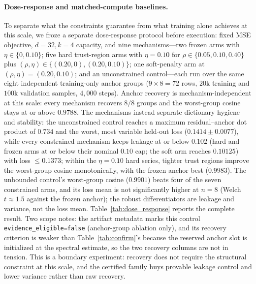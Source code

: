 \documentclass{article}
\theoremstyle{plain}
\begin{document}
{\paragraph{Dose-response and matched-compute baselines.} To separate what the constraints guarantee from what training alone achieves at this scale, we froze a separate dose-response protocol before execution: fixed MSE objective, $d{=}32,k{=}4$ capacity, and nine mechanisms---two frozen arms with $\eta\in\{0,0.10\}$; five hard trust-region arms with $\eta=0.10$ for $\rho\in\{0.05,0.10,0.40\}$ plus $(\rho,\eta)\in\{(0.20,0),(0.20,0.10)\}$; one soft-penalty arm at $(\rho,\eta)=(0.20,0.10)$; and an unconstrained control---each run over the same eight independent training-only anchor groups ($9\times 8=72$ rows, $20$k training and $100$k validation samples, $4{,}000$ steps). Anchor recovery is mechanism-independent at this scale: every mechanism recovers $8/8$ groups and the worst-group cosine stays at or above $0.9788$. The mechanisms instead separate dictionary hygiene and stability: the unconstrained control reaches a maximum residual--anchor dot product of $0.734$ and the worst, most variable held-out loss ($0.1414\pm0.0077$), while every constrained mechanism keeps leakage at or below $0.102$ (hard and frozen arms at or below their nominal $0.10$ cap; the soft arm reaches $0.10125$) with loss $\le 0.1373$; within the $\eta=0.10$ hard series, tighter trust regions improve the worst-group cosine monotonically, with the frozen anchor best ($0.9983$). The unbounded control's worst-group cosine ($0.9901$) beats four of the seven constrained arms, and its loss mean is not significantly higher at $n=8$ (Welch $t\approx1.5$ against the frozen anchor); the robust differentiators are leakage and variance, not the loss mean. Table~\ref{tab:dose_response} reports the complete result. Two scope notes: the artifact metadata marks this control \texttt{evidence\_eligible=false} (anchor-group ablation only), and its recovery criterion is weaker than Table~\ref{tab:confirm}'s because the reserved anchor slot is initialized at the spectral estimate, so the two recovery columns are not in tension. This is a boundary experiment: recovery does not require the structural constraint at this scale, and the certified family buys provable leakage control and lower variance rather than raw recovery.

}
\end{document}
